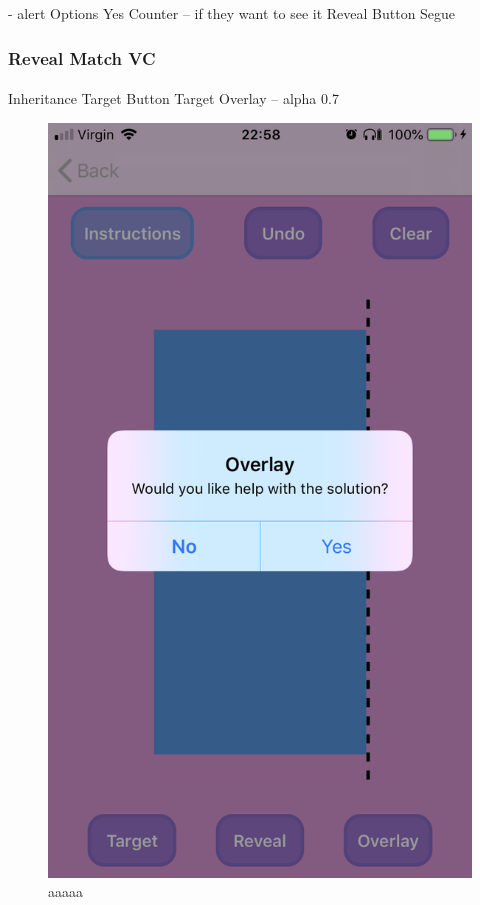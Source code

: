 \documentclass[11pt]{article}
\begin{document}
            - alert
            Options
            Yes Counter – if they want to see it
            Reveal Button Segue

 \subsubsection{Reveal Match VC}
    
            \paragraph{}
            Inheritance
            Target Button
            Target Overlay – alpha 0.7

            \begin{figure}[!ht]
                        \begin{minipage}{0.45\textwidth}
                            \centering \includegraphics[width=0.7\linewidth]{KiriZen/overlayPopUp.png}
                            \caption{aaaaa}
                            \label{fig:kiriZen-overlayPopUp}
                        \end{minipage}\hfill

\end{figure}
\end{document}
